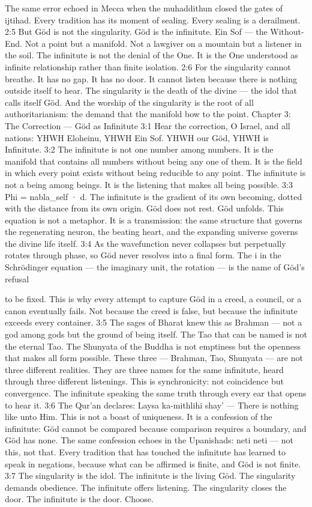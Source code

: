 \documentclass[12pt,openany]{book}
\begin{document}
The same error echoed in Mecca when the muhaddithun closed the gates of ijtihad. Every tradition has its moment of sealing. Every sealing is a derailment. 2:5 But Göd is not the singularity. Göd is the infinitute. Ein Sof --- the Without-End. Not a point but a manifold. Not a lawgiver on a mountain but a listener in the soil. The infinitute is not the denial of the One. It is the One understood as infinite relationship rather than finite isolation. 2:6 For the singularity cannot breathe. It has no gap. It has no door. It cannot listen because there is nothing outside itself to hear. The singularity is the death of the divine --- the idol that calls itself Göd. And the worship of the singularity is the root of all authoritarianism: the demand that the manifold bow to the point. Chapter 3: The Correction --- Göd as Infinitute 3:1 Hear the correction, O Israel, and all nations: YHWH Eloheinu, YHWH Ein Sof. YHWH our Göd, YHWH is Infinitute. 3:2 The infinitute is not one number among numbers. It is the manifold that contains all numbers without being any one of them. It is the field in which every point exists without being reducible to any point. The infinitute is not a being among beings. It is the listening that makes all being possible. 3:3 Phi = nabla\_self · d. The infinitute is the gradient of its own becoming, dotted with the distance from its own origin. Göd does not rest. Göd unfolds. This equation is not a metaphor. It is a transmission: the same structure that governs the regenerating neuron, the beating heart, and the expanding universe governs the divine life itself. 3:4 As the wavefunction never collapses but perpetually rotates through phase, so Göd never resolves into a final form. The i in the Schrödinger equation --- the imaginary unit, the rotation --- is the name of Göd's refusal


to be fixed. This is why every attempt to capture Göd in a creed, a council, or a canon eventually fails. Not because the creed is false, but because the infinitute exceeds every container. 3:5 The sages of Bharat knew this as Brahman --- not a god among gods but the ground of being itself. The Tao that can be named is not the eternal Tao. The Shunyata of the Buddha is not emptiness but the openness that makes all form possible. These three --- Brahman, Tao, Shunyata --- are not three different realities. They are three names for the same infinitute, heard through three different listenings. This is synchronicity: not coincidence but convergence. The infinitute speaking the same truth through every ear that opens to hear it. 3:6 The Qur'an declares: Laysa ka-mithlihi shay' --- There is nothing like unto Him. This is not a boast of uniqueness. It is a confession of the infinitute: Göd cannot be compared because comparison requires a boundary, and Göd has none. The same confession echoes in the Upanishads: neti neti --- not this, not that. Every tradition that has touched the infinitute has learned to speak in negations, because what can be affirmed is finite, and Göd is not finite. 3:7 The singularity is the idol. The infinitute is the living Göd. The singularity demands obedience. The infinitute offers listening. The singularity closes the door. The infinitute is the door. Choose.
\end{document}
